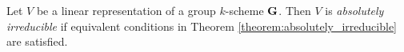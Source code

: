 \begin{definition}
Let $V$ be a linear representation of a group $k$-scheme $\mathbf{G}$. Then $V$ is \textit{absolutely irreducible} if equivalent conditions in Theorem \ref{theorem:absolutely_irreducible} are satisfied.
\end{definition}






















































\small







